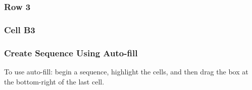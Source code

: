 \documentclass[color=usenames,dvipsnames]{beamer}\usepackage[]{graphicx}\usepackage[]{color}
\begin{document}
\begin{frame}
  \frametitle{Row 3}
\end{frame}



\begin{frame}
  \frametitle{Cell B3}
\end{frame}



\begin{frame}
  \frametitle{Create Sequence Using Auto-fill}
  \centering
  To use auto-fill: begin a sequence, highlight the cells, and then
  drag the box at the bottom-right of the last cell. %
\end{frame}
\end{document}
